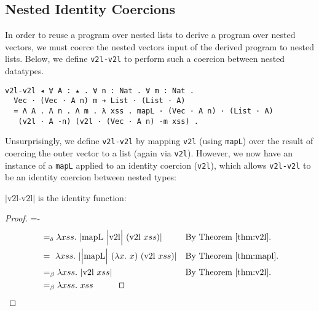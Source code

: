 \documentclass[a4paper,envcountsame,envcountsect]{llncs}
\newcommand{\eqed}[0]{\tag*{\qed}}
\newcommand{\refthm}[1]{Theorem \ref{thm:#1}}
\newcommand{\labthm}[1]{\label{thm:#1}}
\newcommand{\earg}[1]{\,\,#1}
\newcommand{\erase}[1]{\ensuremath{\lvert #1 \rvert}}
\newcommand{\Erase}[1]{\ensuremath{\Big\lvert #1 \Big\rvert}}
\newcommand{\fun}[1]{\lambda #1 .~}
\newcommand{\by}[1]{\text{#1}}
\newcommand{\name}[1]{\textrm{#1}}
\begin{document}

\subsection{Nested Identity Coercions}

In order to reuse a program over nested lists to derive a program
over nested vectors, we must coerce the nested vectors input of the
derived program to nested lists. Below, we define \texttt{v2l-v2l}
to perform such a coercion between nested datatypes.

\begin{verbatim}
v2l-v2l ◂ ∀ A : ★ . ∀ n : Nat . ∀ m : Nat .
  Vec · (Vec · A n) m ➔ List · (List · A)
  = Λ A . Λ n . Λ m . λ xss . mapL · (Vec · A n) · (List · A) 
   (v2l · A -n) (v2l · (Vec · A n) -m xss) .
\end{verbatim}

Unsurprisingly, we define \texttt{v2l-v2l} by mapping \texttt{v2l}
(using \texttt{mapL}) over the result of coercing the outer vector to a
list (again via \texttt{v2l}). However, we now have an instance of a
\texttt{mapL} applied to an identity coercion (\texttt{v2l}), which
allows \texttt{v2l-v2l} to be an identity coercion between nested types:

\begin{theorem}
\erase{\name{v2l-v2l}} is the identity function:
\labthm{v2lv2l}
\end{theorem}

\begin{proof}
{\small
\abovedisplayskip=-\baselineskip
\begin{align*}
  &=_\delta \fun{xss} \erase{
    \name{mapL} \earg \Erase{\name{v2l}} \earg (\name{v2l} \earg xss)
  }
  && \by{By \refthm{v2l}.}
  \\
  &=~ \fun{xss} \erase{
    \Erase{\name{mapL}} \earg (\fun{x}{x}) \earg (\name{v2l} \earg xss)
  }
  && \by{By \refthm{mapl}.}
  \\
  &=_\beta \fun{xss} \erase{
    \name{v2l} \earg xss
  }
  && \by{By \refthm{v2l}.}
  \\
  &=_\beta \fun{xss}{xss}
  \eqed
\end{align*}}
\end{proof}
\end{document}
